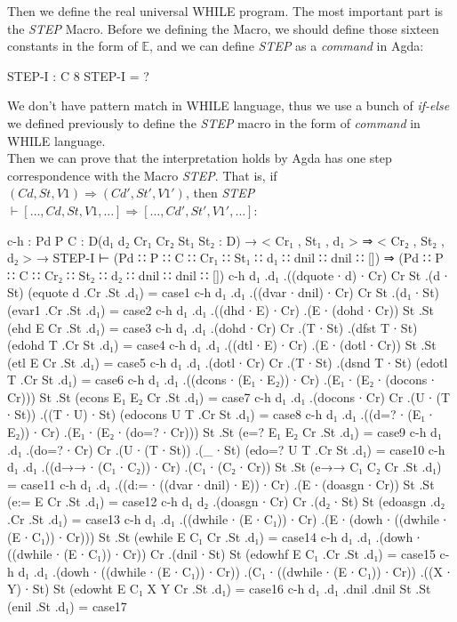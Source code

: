 \documentclass{jfrarticle}
\newcommand{\md}[1]{$\mathds{#1}$}
\begin{document}
Then we define the real universal WHILE program.
The most important part is the \textit{STEP} Macro.
Before we defining the Macro, we should define those sixteen constants in the form of \md{E}, and we can define \textit{STEP} as a \textit{command} in Agda:
\begin{code}[fontsize=\small]
STEP-I : C 8
STEP-I =  ?
\end{code}
We don't have pattern match in WHILE language, thus we use a bunch of \textit{if-else} we defined previously to define the \textit{STEP} macro in the form of \textit{command} in WHILE language.\\ 
Then we can prove that the interpretation holds by Agda has one step correspondence with the Macro \textit{STEP}.
That is, if $(Cd,St,V1)\Rightarrow(Cd',St',V1')$, then \textit{STEP} $\vdash [\dots, Cd, St, V1, \dots] \Rightarrow [\dots, Cd', St', V1', \dots]$:
\begin{code}[fontsize=\footnotesize]
c-h : {Pd P C : D}(d₁ d₂ Cr₁ Cr₂ St₁ St₂ : D) 
      → < Cr₁ , St₁ , d₁ > ⇒ < Cr₂ , St₂ , d₂ >
      → STEP-I ⊢ (Pd ∷ P ∷ C ∷ Cr₁ ∷ St₁ ∷ d₁ ∷ dnil ∷ dnil ∷ [])
               ⇒ (Pd ∷ P ∷ C ∷ Cr₂ ∷ St₂ ∷ d₂ ∷ dnil ∷ dnil ∷ [])
c-h d₁ .d₁ .((dquote ∙ d) ∙ Cr) Cr St .(d ∙ St) (equote d .Cr .St .d₁) = case1
c-h d₁ .d₁ .((dvar ∙ dnil) ∙ Cr) Cr St .(d₁ ∙ St) (evar1 .Cr .St .d₁) = case2
c-h d₁ .d₁ .((dhd ∙ E) ∙ Cr) .(E ∙ (dohd ∙ Cr)) St .St (ehd E Cr .St .d₁) = case3
c-h d₁ .d₁ .(dohd ∙ Cr) Cr .(T ∙ St) .(dfst T ∙ St) (edohd T .Cr St .d₁) = case4
c-h d₁ .d₁ .((dtl ∙ E) ∙ Cr) .(E ∙ (dotl ∙ Cr)) St .St (etl E Cr .St .d₁) = case5
c-h d₁ .d₁ .(dotl ∙ Cr) Cr .(T ∙ St) .(dsnd T ∙ St) (edotl T .Cr St .d₁) = case6
c-h d₁ .d₁ .((dcons ∙ (E₁ ∙ E₂)) ∙ Cr) .(E₁ ∙ (E₂ ∙ (docons ∙ Cr))) 
					St .St (econs E₁ E₂ Cr .St .d₁) = case7
c-h d₁ .d₁ .(docons ∙ Cr) Cr .(U ∙ (T ∙ St)) .((T ∙ U) ∙ St) 
						(edocons U T .Cr St .d₁) = case8
c-h d₁ .d₁ .((d=? ∙ (E₁ ∙ E₂)) ∙ Cr) .(E₁ ∙ (E₂ ∙ (do=? ∙ Cr))) St .St 
						(e=? E₁ E₂ Cr .St .d₁) = case9
c-h d₁ .d₁ .(do=? ∙ Cr) Cr .(U ∙ (T ∙ St)) .(_ ∙ St) 
						(edo=? U T .Cr St .d₁) = case10
c-h d₁ .d₁ .((d→→ ∙ (C₁ ∙ C₂)) ∙ Cr) .(C₁ ∙ (C₂ ∙ Cr)) St .St 
						(e→→ C₁ C₂ Cr .St .d₁) = case11
c-h d₁ .d₁ .((d:= ∙ ((dvar ∙ dnil) ∙ E)) ∙ Cr) .(E ∙ (doasgn ∙ Cr)) St .St 
							(e:= E Cr .St .d₁) = case12
c-h d₁  d₂ .(doasgn ∙ Cr) Cr .(d₂ ∙ St) St (edoasgn .d₂ .Cr .St .d₁) = case13
c-h d₁ .d₁ .((dwhile ∙ (E ∙ C₁)) ∙ Cr) .(E ∙ (dowh ∙ ((dwhile ∙ (E ∙ C₁)) ∙ Cr))) 
					St .St (ewhile E C₁ Cr .St .d₁) = case14
c-h d₁ .d₁ .(dowh ∙ ((dwhile ∙ (E ∙ C₁)) ∙ Cr)) Cr .(dnil ∙ St) St 
						(edowhf E C₁ .Cr .St .d₁) = case15
c-h d₁ .d₁ .(dowh ∙ ((dwhile ∙ (E ∙ C₁)) ∙ Cr)) .(C₁ ∙ ((dwhile ∙ (E ∙ C₁)) ∙ Cr)) 
			.((X ∙ Y) ∙ St) St (edowht E C₁ X Y Cr .St .d₁) = case16
c-h d₁ .d₁ .dnil .dnil St .St (enil .St .d₁) = case17
\end{code}
\end{document}
